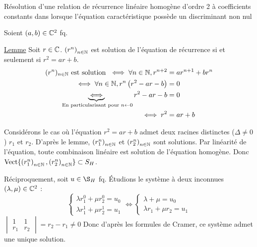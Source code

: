 \documentclass{article}
\renewenvironment{question_kholle}[2][ ]
{
	\subsection{\texorpdfstring{#2}{}}
	\notblank{#1}
	{
		\noindent #1
		\bigbreak
	}
	{}
	\begin{proof}
}
{
	\end{proof}
}
\begin{document}
	\begin{question_kholle}
		[Soient $(a,b) \in \C^2$.
		L'ensemble des solutions $S_H$ de l'équation d'inconnue $u \in \C^\N$
		\begin{equation}
			\forall n \in \N, u_{n+2} = a u_{n+1} + b u_n
		\end{equation}
		est le plan vectoriel $\text{Vect}\{ \left(r_1^n\right)_{n\in\N}, \left(r_2^n\right)_{n\in\N} \}$ où $r_1$ et $r_2$ sont les racines de l'équation caractéristique ($r^2 = ar + b$) quand $\Delta \neq 0$.]
		{Résolution d'une relation de récurrence linéaire homogène d'ordre 2 à coefficients constants dans \C lorsque l'équation caractéristique possède un discriminant non nul}

		Soient $(a,b) \in \C^2$ fq.

		\underline{Lemme} Soit $r \in \mathbb C$. $\left(r^n\right)_{n\in\mathbb N}$ est solution de l'équation de récurrence si et seulement si $r^2 = ar + b$.
		\begin{equation*}
			\begin{aligned}
				(r^n)_{n\in\mathbb N} \text{ est solution }
				\iff \forall n \in \mathbb N, r^{n+2} &= a r^{n+1} + b r^n \\
				\iff \forall n \in \mathbb N, r^{n} \left( r^2 - a r - b \right) &= 0 \\
				\underbrace{\iff}_{\text{ En particularisant pour } n \leftarrow 0} r^2 - a r - b &= 0 \\
				\iff r^2 &= a r + b
			\end{aligned}
		\end{equation*}

		Considérons le cas où l'équation $r^2 = ar + b$ admet deux racines distinctes ($\Delta \neq 0$) $r_1$ et $r_2$.
		D'après le lemme, $\left(r_1^n\right)_{n\in\mathbb N}$ et $\left(r_2^n\right)_{n\in\mathbb N}$ sont solutions. Par linéarité de l'équation, toute combinaison linéaire est solution de l'équation homogène.
		Donc $\text{Vect}\{ \left(r_1^n\right)_{n\in\mathbb N}, \left(r_2^n\right)_{n\in\mathbb N} \} \subset S_H$.

		Réciproquement, soit $u \in \S_H$ fq.
		Étudions le système à deux inconnues $(\lambda, \mu) \in \mathbb C^2$ :
		\begin{equation*}
			\left\{ \begin{matrix}
				\lambda r_1^0 + \mu r_2^0 = u_0 \\
				\lambda r_1^1 + \mu r_2^1 = u_1
			\end{matrix} \right.
			\iff \left\{ \begin{matrix}
				\lambda + \mu = u_0 \\
				\lambda r_1 + \mu r_2 = u_1
			\end{matrix} \right.
		\end{equation*}
		$\begin{vmatrix}
			1 & 1 \\
			r_1 & r_2
		\end{vmatrix}
		= r_2 - r_1 \neq 0$
		Donc d'après les formules de Cramer, ce système admet une unique solution.


\end{question_kholle}
\end{document}
